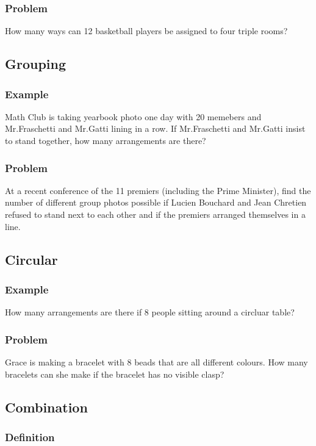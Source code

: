 \documentclass{article}
\begin{document}
\subsubsection{Problem}
How many ways can 12 basketball players be assigned to four triple rooms?
\pagebreak

\subsection{Grouping}
\subsubsection{Example}
Math Club is taking yearbook photo one day with 20 memebers and Mr.Fraschetti and Mr.Gatti lining in a row. If Mr.Fraschetti and Mr.Gatti insist to stand together, how many arrangements are there?
\vspace{20px}
\subsubsection{Problem}
At a recent conference of the 11 premiers (including the Prime Minister), find the number of different group photos possible if Lucien Bouchard and Jean Chretien
refused to stand next to each other and if the premiers arranged themselves in a line.
\vspace{20px}
\subsection{Circular}
\subsubsection{Example}
How many arrangements are there if 8 people sitting around a circluar table?
\vspace{20px}
\subsubsection{Problem}
Grace is making a bracelet with 8 beads that are all different colours. How many bracelets can she make if the bracelet has no visible clasp?
\vspace{20px}
\subsection{Combination}
\subsubsection{Definition}
\vspace{20px}
\end{document}
